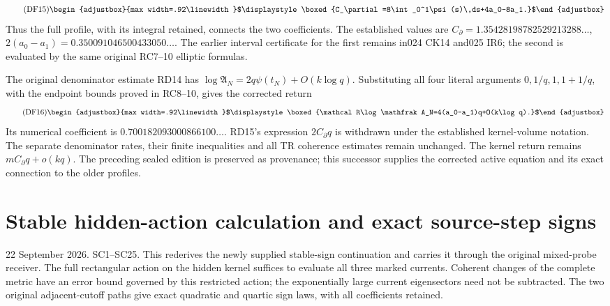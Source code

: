 \documentclass[10pt]{article}
\begin{document}
\begin{equation*}
\tag{DF15}
\begin{adjustbox}{max width=.92\linewidth}$\displaystyle \boxed{C_\partial=8\int_0^1\psi(s)\,ds+4a_0-8a_1.}$\end{adjustbox}
\end{equation*}
 Thus the full profile, with its integral retained, connects the two coefficients. The established values are \(C_\partial=1.35428198782529213288\ldots\), \(2(a_0-a_1)=0.350091046500433050\ldots\). The earlier interval certificate for the first remains in024 CK14 and025 IR6; the second is evaluated by the same original RC7--10 elliptic formulas.

The original denominator estimate RD14 has \(\log\mathfrak A_N=2q\psi(t_N)+O(k\log q)\). Substituting all four literal arguments \(0,1/q,1,1+1/q\), with the endpoint bounds proved in RC8--10, gives the corrected return 
\begin{equation*}
\tag{DF16}
\begin{adjustbox}{max width=.92\linewidth}$\displaystyle \boxed{\mathcal R\log\mathfrak A_N=4(a_0-a_1)q+O(k\log q).}$\end{adjustbox}
\end{equation*}
 Its numerical coefficient is \(0.700182093000866100\ldots\). RD15's expression \(2C_\partial q\) is withdrawn under the established kernel-volume notation. The separate denominator rates, their finite inequalities and all TR coherence estimates remain unchanged. The kernel return remains \(mC_\partial q+o(kq)\). The preceding sealed edition is preserved as provenance; this successor supplies the corrected active equation and its exact connection to the older profiles.

\clearpage
\section{Stable hidden-action calculation and exact source-step signs}\label{stable-hidden-action-calculation-and-exact-source-step-signs}

22 September 2026. SC1--SC25. This rederives the newly supplied stable-sign continuation and carries it through the original mixed-probe receiver. The full rectangular action on the hidden kernel suffices to evaluate all three marked currents. Coherent changes of the complete metric have an error bound governed by this restricted action; the exponentially large current eigensectors need not be subtracted. The two original adjacent-cutoff paths give exact quadratic and quartic sign laws, with all coefficients retained.
\end{document}
